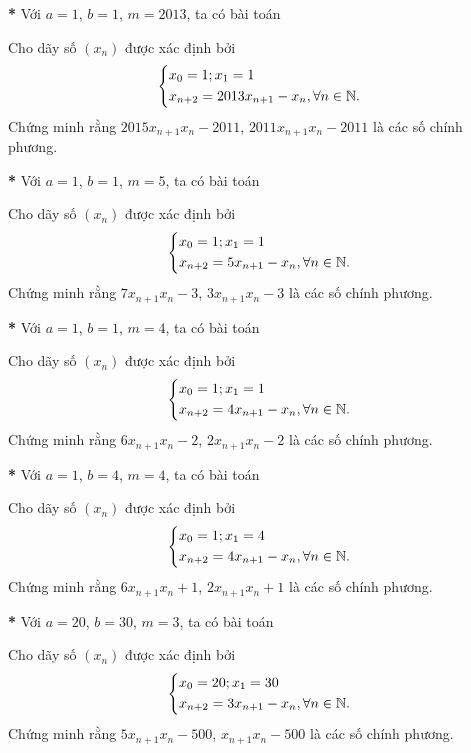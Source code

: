 \textbf{*} Với $a=1$, $b=1$, $m=2013$, ta có bài toán
\begin{vd}%
	Cho dãy số $(x_n)$ được xác định bởi
	$$\left\{\begin{aligned}&x_0=1;x_1=1\\&x_{n+2}=2013x_{n+1}-x_n,\forall n\in\mathbb{N}.\end{aligned}\right.$$
	Chứng minh rằng $2015x_{n+1}x_n-2011$, $2011x_{n+1}x_n-2011$ là các số chính phương.
\end{vd}
\textbf{*} Với $a=1$, $b=1$, $m=5$, ta có bài toán
\begin{vd}%
	Cho dãy số $(x_n)$ được xác định bởi
	$$\left\{\begin{aligned}&x_0=1;x_1=1\\&x_{n+2}=5x_{n+1}-x_n,\forall n\in\mathbb{N}.\end{aligned}\right.$$
	Chứng minh rằng $7x_{n+1}x_n-3$, $3x_{n+1}x_n-3$ là các số chính phương.
\end{vd}%
\textbf{* }Với $a=1$, $b=1$, $m=4$, ta có bài toán
\begin{vd}
	Cho dãy số $(x_n)$ được xác định bởi
	$$\left\{\begin{aligned}&x_0=1;x_1=1\\&x_{n+2}=4x_{n+1}-x_n,\forall n\in\mathbb{N}.\end{aligned}\right.$$
	Chứng minh rằng $6x_{n+1}x_n-2$, $2x_{n+1}x_n-2$ là các số chính phương.
\end{vd}
\textbf{*} Với $a=1$, $b=4$, $m=4$, ta có bài toán
\begin{vd}%
	Cho dãy số $(x_n)$ được xác định bởi
	$$\left\{\begin{aligned}&x_0=1;x_1=4\\&x_{n+2}=4x_{n+1}-x_n,\forall n\in\mathbb{N}.\end{aligned}\right.$$
	Chứng minh rằng $6x_{n+1}x_n+1$, $2x_{n+1}x_n+1$ là các số chính phương.
\end{vd}
\textbf{*} Với $a=20$, $b=30$, $m=3$, ta có bài toán
\begin{vd}%
	Cho dãy số $(x_n)$ được xác định bởi
	$$\left\{\begin{aligned}&x_0=20;x_1=30\\&x_{n+2}=3x_{n+1}-x_n,\forall n\in\mathbb{N}.\end{aligned}\right.$$
	Chứng minh rằng $5x_{n+1}x_n-500$, $x_{n+1}x_n-500$ là các số chính phương.
\end{vd}
